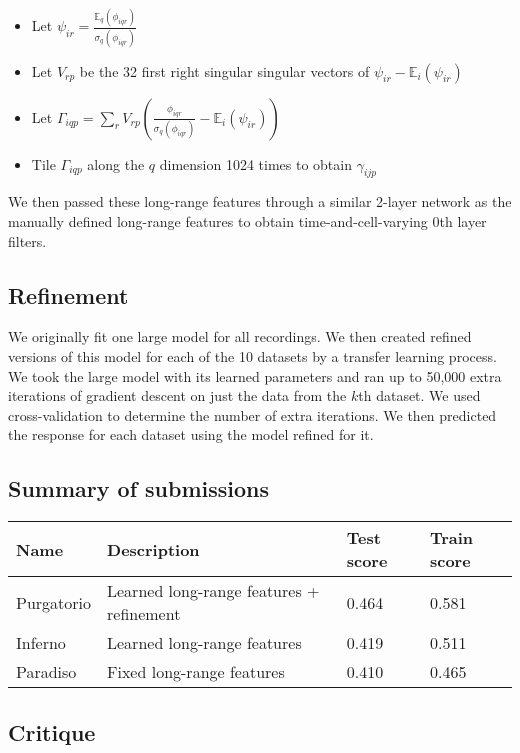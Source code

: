 \documentclass[]{article}
\providecommand{\tightlist}{%
  \setlength{\itemsep}{0pt}\setlength{\parskip}{0pt}}
\begin{document}
\begin{itemize}
\tightlist
\item
  Let
  \(\psi_{ir} = \frac{\mathbb{E}_q({\phi}_{iqr})}{\sigma_q({\phi_{iqr}})}\)
\item
  Let \(V_{rp}\) be the 32 first right singular singular vectors of
  \(\psi_{ir} - \mathbb{E}_i(\psi_{ir})\)
\item
  Let
  \(\Gamma_{iqp} = \sum_r V_{rp} \left( \frac{\phi_{iqr}}{\sigma_q({\phi_{iqr}})} - \mathbb{E}_i(\psi_{ir}) \right)\)
\item
  Tile \(\Gamma_{iqp}\) along the \(q\) dimension 1024 times to obtain
  \(\gamma_{ijp}\)
\end{itemize}

We then passed these long-range features through a similar 2-layer
network as the manually defined long-range features to obtain
time-and-cell-varying \(0\)th layer filters.

\subsection{Refinement}\label{refinement}

We originally fit one large model for all recordings. We then created
refined versions of this model for each of the 10 datasets by a transfer
learning process. We took the large model with its learned parameters
and ran up to 50,000 extra iterations of gradient descent on just the
data from the \(k\)th dataset. We used cross-validation to determine the
number of extra iterations. We then predicted the response for each
dataset using the model refined for it.

\subsection{Summary of submissions}\label{summary-of-submissions}

\begin{longtable}[c]{@{}llll@{}}
\toprule
Name & Description & Test score & Train score\tabularnewline
\midrule
\endhead
Purgatorio & Learned long-range features + refinement & 0.464 &
0.581\tabularnewline
Inferno & Learned long-range features & 0.419 & 0.511\tabularnewline
Paradiso & Fixed long-range features & 0.410 & 0.465\tabularnewline
\bottomrule
\end{longtable}

\subsection{Critique}\label{critique}
\end{document}
